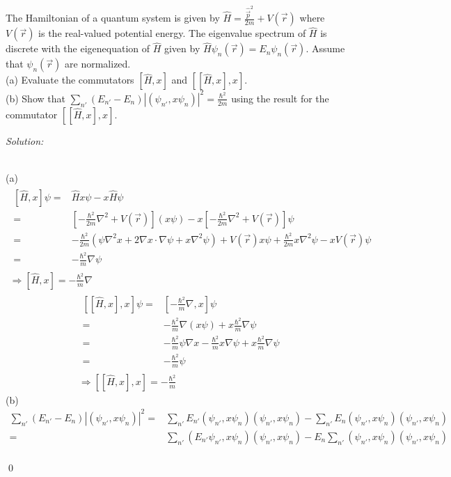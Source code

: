 \documentclass[12pt,a4paper]{article}
\newenvironment{problem}[2][Problem]{\begin{trivlist}
\item[\hskip \labelsep {\bfseries #1}\hskip \labelsep {\bfseries #2.}]}{\end{trivlist}}
\newenvironment{sol}
    {\emph{Solution:}
    }
    {
    \qed
    }
\begin{document}
\begin{problem}{1}
The Hamiltonian of a quantum system is given by $\hat{H}=\frac{\hat{\vec{p}}^2}{2m}+V(\vec{r})$ where $V(\vec{r})$ is the real-valued potential energy. The eigenvalue spectrum of $\hat{H}$ is discrete with the eigenequation of $\hat{H}$ given by $\hat{H}\psi_n(\vec{r})=E_n\psi_n(\vec{r})$. Assume that $\psi_n(\vec{r})$ are normalized.\\
(a) Evaluate the commutators $[\hat{H},x]$ and $[[\hat{H},x],x]$.\\
(b) Show that $\sum_{n'}(E_{n'}-E_n)|(\psi_{n'},x\psi_n)|^2=\frac{\hbar^2}{2m}$ using the result for the commutator $[[\hat{H},x],x]$.
\end{problem}
\begin{sol}
\\(a)
\begin{gather}
\begin{align}
\nonumber[\hat{H},x]\psi=&\hat{H}x\psi-x\hat{H}\psi\\
\nonumber=&[-\frac{\hbar^2}{2m}\nabla^2+V(\vec{r})](x\psi)-x[-\frac{\hbar^2}{2m}\nabla^2+V(\vec{r})]\psi\\
\nonumber=&-\frac{\hbar^2}{2m}(\psi\nabla^2x+2\nabla x\cdot\nabla\psi+x\nabla^2\psi)+V(\vec{r})x\psi+\frac{\hbar^2}{2m}x\nabla^2\psi-xV(\vec{r})\psi\\
=&-\frac{\hbar^2}{m}\nabla\psi
\end{align}\\
\Longrightarrow[\hat{H},x]=-\frac{\hbar^2}{m}\nabla
\end{gather}
\begin{gather}
\begin{align}
\nonumber[[\hat{H},x],x]\psi=&[-\frac{\hbar^2}{m}\nabla,x]\psi\\
\nonumber=&-\frac{\hbar^2}{m}\nabla(x\psi)+x\frac{\hbar^2}{m}\nabla\psi\\
\nonumber=&-\frac{\hbar^2}{m}\psi\nabla x-\frac{\hbar^2}{m}x\nabla\psi+x\frac{\hbar^2}{m}\nabla\psi\\
=&-\frac{\hbar^2}{m}\psi
\end{align}\\
\Longrightarrow[[\hat{H},x],x]=-\frac{\hbar^2}{m}
\end{gather}
(b)
\begin{align}
\nonumber\sum_{n'}(E_{n'}-E_n)|(\psi_{n'},x\psi_n)|^2=&\sum_{n'}E_{n'}(\psi_{n'},x\psi_n)(\psi_{n'},x\psi_n)-\sum_{n'}E_n(\psi_{n'},x\psi_n)(\psi_{n'},x\psi_n)\\
\nonumber=&\sum_{n'}(E_{n'}\psi_{n'},x\psi_n)(\psi_{n'},x\psi_n)-E_n\sum_{n'}(\psi_{n'},x\psi_n)(\psi_{n'},x\psi_n)\\

\end{align}
\end{sol}
\end{document}
